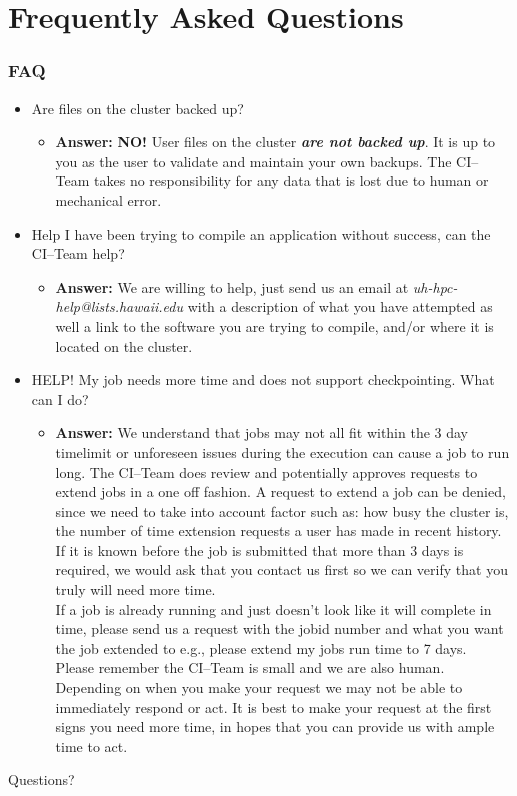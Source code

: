 \documentclass[t,hyperref={pdfpagelabels=false}]{beamer}
\newcommand{\citeam}{CI--Team}
\begin{document}
\section{Frequently Asked Questions}
\begin{frame}
\frametitle{FAQ}
\begin{itemize}\footnotesize
\item Are files on the cluster backed up?
  \begin{itemize}\tiny
  \item \textbf{Answer:} \textbf{NO!}  User files on the cluster \textbf{\emph{are not backed up}}.  It is up to you as the user to validate and maintain your own backups.  The {\citeam} takes no responsibility for any data that is lost due to human or mechanical error.  
  \end{itemize}

\item Help I have been trying to compile an application without success, can the {\citeam} help?
  \begin{itemize}\tiny
  \item \textbf{Answer:} We are willing to help, just send us an email at \textit{uh-hpc-help@lists.hawaii.edu} with a description of what you have attempted as well a link to the software you are trying to compile, and/or where it is located on the cluster.
  \end{itemize}
  
\item HELP! My job needs more time and does not support checkpointing.  What can I do?
  \begin{itemize}\tiny
  \item \textbf{Answer:} We understand that jobs may not all fit within the 3 day timelimit or unforeseen issues during the execution can cause a job to run long.  The {\citeam} does review and potentially approves requests to extend jobs in a one off fashion.  A request to extend a job can be denied, since we need to take into account factor such as: how busy the cluster is, the number of time extension requests a user has made in recent history.\\If it is known before the job is submitted that more than 3 days is required, we would ask that you contact us first so we can verify that you truly will need more time.\\If a job is already running and just doesn't look like it will complete in time, please send us a request with the jobid number and what you want the job extended to e.g., please extend my jobs run time to 7 days.\\Please remember the {\citeam} is small and we are also human.  Depending on when you make your request we may not be able to immediately respond or act.  It is best to make your request at the first signs you need more time, in hopes that you can provide us with ample time to act.
  \end{itemize}


\end{itemize}



\end{frame}


\begin{frame}
\Huge{\centerline{Questions?}}
\end{frame}
\end{document}
